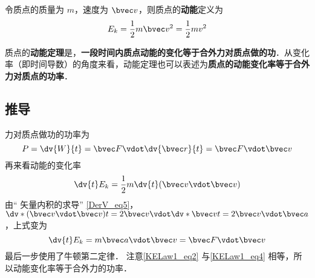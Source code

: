 

令质点的质量为 $m$，速度为 $\bvec v$，则质点的\textbf{动能}定义为
\begin{equation}
E_k = \frac12 m\bvec v^2 = \frac12 mv^2
\end{equation}

质点的\textbf{动能定理}是，\textbf{一段时间内质点动能的变化等于合外力对质点做的功}．从变化率（即时间导数）的角度来看，动能定理也可以表述为\textbf{质点的动能变化率等于合外力对质点的功率}．

\subsection{推导}
力对质点做功的功率为
\begin{equation}\label{KELaw1_eq2}
P = \dv{W}{t} =  \bvec F\vdot \dv{\bvec r}{t} = \bvec F\vdot\bvec v
\end{equation}
再来看动能的变化率
\begin{equation}
\dv{t} E_k = \frac12 m\dv{t} (\bvec v\vdot\bvec v)
\end{equation}
由“ 矢量内积的求导” \autoref{DerV_eq5}，$\dv*{(\bvec v\vdot\bvec v)}{t} = 2\bvec v\vdot \dv*{\bvec v}{t} = 2\bvec v\vdot\bvec a$，上式变为
\begin{equation}\label{KELaw1_eq4}
\dv{t} E_k = m\bvec a\vdot\bvec v = \bvec F\vdot\bvec v
\end{equation}
最后一步使用了牛顿第二定律．%
注意\autoref{KELaw1_eq2} 与\autoref{KELaw1_eq4} 相等，所以动能变化率等于合外力的功率．